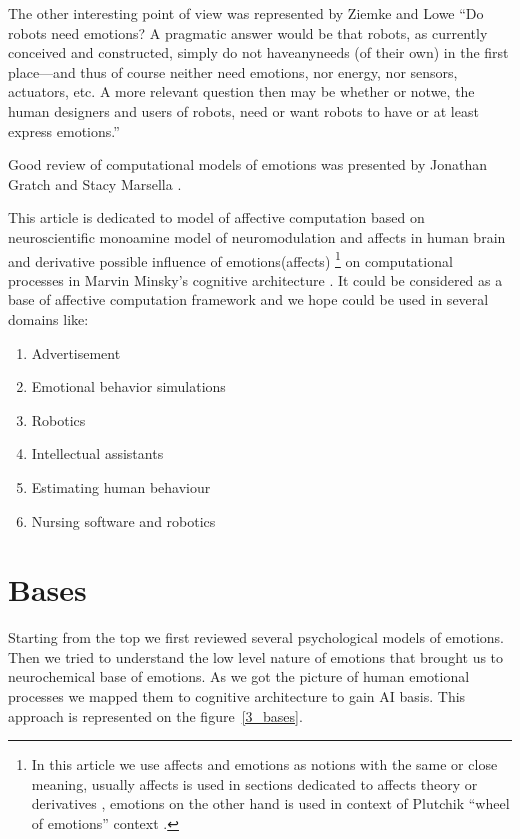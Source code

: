 The other interesting point of view was represented by Ziemke and Lowe \cite{on_role_of_emotion, emotionsbraintorobot} ``Do robots need emotions? A pragmatic answer would be that robots, as currently conceived and constructed, simply do not haveanyneeds (of their own) in the first place—and thus of course neither need emotions, nor energy, nor sensors, actuators, etc. A more relevant question then may be whether or notwe, the human designers and users of robots, need or want robots to have or at least express emotions.''

Good review of computational models of emotions was presented by Jonathan Gratch and Stacy Marsella \cite{evaluatingcomutationalmodel, computationalmodelsemotion}.

This article is dedicated to model of affective computation based on neuroscientific monoamine model of neuromodulation and affects in human brain and derivative possible influence of emotions(affects) \footnote{In this article we use affects and emotions as notions with the same or close meaning, usually affects is used in sections dedicated to affects theory \cite{tomkins1, tomkins2, tomkins3} or derivatives \cite{cubeofemotions}, emotions on the other hand is used in context of Plutchik ``wheel of emotions'' context \cite{natureofemotions}.} on computational processes in Marvin Minsky's cognitive architecture \cite{emotionmachine}. It could be considered as a base of affective computation framework and we hope could be used in several domains like:

\begin{enumerate}
 \item  Advertisement
 \item  Emotional behavior simulations
 \item  Robotics
 \item  Intellectual assistants
 \item  Estimating human behaviour
 \item  Nursing software and robotics
\end{enumerate}

\section{Bases}

Starting from the top we first reviewed several psychological models of emotions. Then we tried to understand the low level nature of emotions that brought us to neurochemical base of emotions. As we got the picture of human emotional processes we mapped them to cognitive architecture to gain AI basis. This approach is represented on the figure~\ref{3_bases}.

